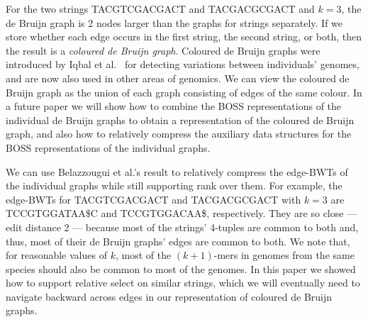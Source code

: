 For the two strings {\sf TACGTCGACGACT} and {\sf TACGACGCGACT} and \(k = 3\), the de Bruijn graph is 2 nodes larger than the graphs for strings separately.  If we store whether each edge occurs in the first string, the second string, or both, then the result is a {\em coloured de Bruijn graph}.  Coloured de Bruijn graphs were introduced by Iqbal et al.~\cite{ICTFM12} for detecting variations between individuals' genomes, and are now also used in other areas of genomics.  We can view the coloured de Bruijn graph as the union of each graph consisting of edges of the same colour.  In a future paper we will show how to combine the BOSS representations of the individual de Bruijn graphs to obtain a representation of the coloured de Bruijn graph, and also how to relatively compress the auxiliary data structures for the BOSS representations of the individual graphs.

We can use Belazzougui et al.'s result to relatively compress the edge-BWTs of the individual graphs while still supporting rank over them.  For example, the edge-BWTs for {\sf TACGTCGACGACT} and {\sf TACGACGCGACT} with \(k = 3\) are {\sf TCCGTGGATAA\$C} and {\sf TCCGTGGACAA\$}, respectively.  They are so close --- edit distance 2 --- because most of the strings' 4-tuples are common to both and, thus, most of their de Bruijn graphs' edges are common to both.  We note that, for reasonable values of $k$, most of the \((k + 1)\)-mers in genomes from the same species should also be common to most of the genomes.  In this paper we showed how to support relative select on similar strings, which we will eventually need to navigate backward across edges in our representation of coloured de Bruijn graphs.

